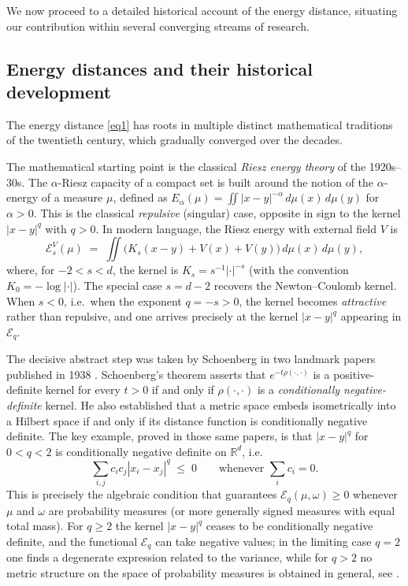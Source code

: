 \documentclass[12pt,a4paper,oneside]{amsart}
\theoremstyle{plain}
\theoremstyle{definition}
\numberwithin{equation}{section}
\numberwithin{figure}{section}
\numberwithin{table}{section}
\theoremstyle{remark}
\newcommand{\R}{\mathbb{R}}
\begin{document}
We now proceed to a detailed historical account of the energy distance, situating our contribution within several converging streams of research.


\subsection{Energy distances and their historical development}\label{sec:histreview}
The energy distance \eqref{eq1} has roots in multiple distinct mathematical traditions of the twentieth century, which gradually converged over the decades.
 
The mathematical starting point is the classical \emph{Riesz energy theory} of the
1920s--30s. The $\alpha$-Riesz capacity of a compact set is built around the notion of the
$\alpha$-energy of a measure $\mu$, defined as
$E_\alpha(\mu) = \iint |x-y|^{-\alpha}\,d\mu(x)\,d\mu(y)$ for $\alpha > 0$.
This is the classical \emph{repulsive} (singular) case, opposite in sign to the
kernel $|x-y|^q$ with $q > 0$.
In modern language, the Riesz energy with external field $V$ is
\[
  \mathcal{E}^V_s(\mu)
  \;=\;
  \iint \!\bigl(K_s(x-y)+V(x)+V(y)\bigr)\,d\mu(x)\,d\mu(y),
\]
where, for $-2 < s < d$, the kernel is $K_s = s^{-1}|\cdot|^{-s}$
(with the convention $K_0 = -\log|\cdot|$).
The special case $s = d-2$ recovers the Newton--Coulomb kernel.
When $s < 0$, i.e.\ when the exponent $q = -s > 0$, the kernel becomes
\emph{attractive} rather than repulsive, and one arrives precisely at the
kernel $|x-y|^q$ appearing in $\mathcal{E}_q$.
 
The decisive abstract step was taken by Schoenberg in two landmark
papers published in 1938 \cite{schoenberg1938monotone,schoenberg1938positive}.
Schoenberg's theorem asserts that $e^{-t\rho(\cdot,\cdot)}$ is a positive-definite kernel for
every $t > 0$ if and only if $\rho(\cdot,\cdot)$ is a \emph{conditionally
negative-definite} kernel.
He also established that a metric space embeds isometrically into a Hilbert space
if and only if its distance function is conditionally negative definite.
The key example, proved in those same papers, is that $|x-y|^q$ for $0 < q < 2$
is conditionally negative definite on $\R^d$, i.e.
\[
  \sum_{i,j} c_i c_j |x_i - x_j|^q \;\leq\; 0
  \qquad\text{whenever } \sum_i c_i = 0.
\]
This is precisely the algebraic condition that guarantees $\mathcal{E}_q(\mu,\omega)\geq 0$
whenever $\mu$ and $\omega$ are probability measures (or more generally signed measures
with equal total mass).
For $q \geq  2$ the kernel $|x-y|^q$ ceases to be conditionally negative definite,
and the functional $\mathcal{E}_q$ can take negative values; in the limiting case
$q = 2$ one finds a degenerate expression related to the variance, while for $q > 2$
no metric structure on the space of probability measures is obtained in general, see \cite[Chapter 3, Section 2, Corollary 2.10]{BergChristensenRessel1984}.
 
\end{document}
